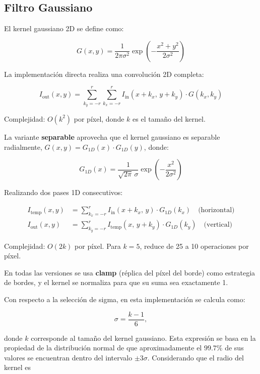 \documentclass[12pt,a4paper]{article}
\begin{document}
\subsection{Filtro Gaussiano}

El kernel gaussiano 2D se define como:

\begin{equation}
G(x, y) = \frac{1}{2\pi\sigma^2} \exp\!\left(-\frac{x^2 + y^2}{2\sigma^2}\right)
\end{equation}

La implementaci\'on directa realiza una convoluci\'on 2D completa:

\begin{equation}
I_{\text{out}}(x,y) = \sum_{k_y=-r}^{r} \sum_{k_x=-r}^{r} I_{\text{in}}(x+k_x,\, y+k_y) \cdot G(k_x, k_y)
\end{equation}

Complejidad: $O(k^2)$ por p\'ixel, donde $k$ es el tama\~no del kernel.

La variante \textbf{separable} aprovecha que el kernel gaussiano es separable radialmente, $G(x,y) = G_{1D}(x) \cdot G_{1D}(y)$, donde:

\begin{equation}
G_{1D}(x) = \frac{1}{\sqrt{2\pi}\,\sigma} \exp\!\left(-\frac{x^2}{2\sigma^2}\right)
\end{equation}

Realizando dos pases 1D consecutivos:

\begin{align}
I_{\text{temp}}(x,y) &= \sum_{k_x=-r}^{r} I_{\text{in}}(x+k_x,\, y) \cdot G_{1D}(k_x) \quad \text{(horizontal)} \\
I_{\text{out}}(x,y)  &= \sum_{k_y=-r}^{r} I_{\text{temp}}(x,\, y+k_y) \cdot G_{1D}(k_y) \quad \text{(vertical)}
\end{align}

Complejidad: $O(2k)$ por p\'ixel. Para $k=5$, reduce de 25 a 10 operaciones por p\'ixel.

En todas las versiones se usa \textbf{clamp} (r\'eplica del p\'ixel del borde) como estrategia de bordes, y el kernel se normaliza para que su suma sea exactamente 1.

Con respecto a la selección de sigma, en esta implementación se calcula como:

\[
\sigma = \frac{k-1}{6},
\]

donde \(k\) corresponde al tamaño del kernel gaussiano. Esta expresión se basa en la propiedad de la distribución normal de que aproximadamente el \(99.7\%\) de sus valores se encuentran dentro del intervalo \(\pm 3\sigma\). Considerando que el radio del kernel es
\end{document}
